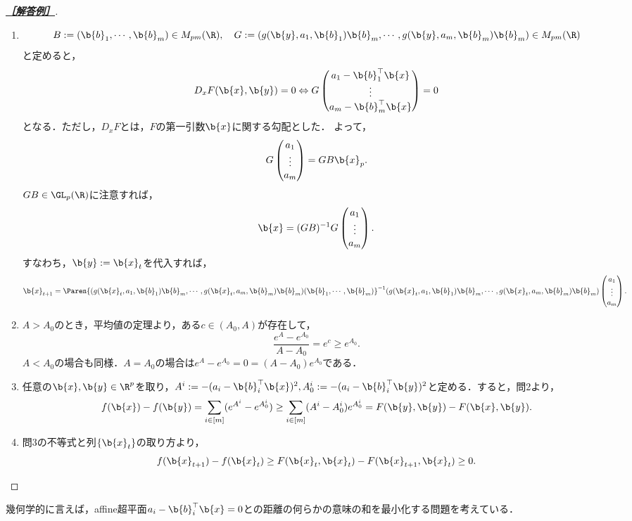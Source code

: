 \documentclass[uplatex,dvipdfmx]{jsarticle}
\begin{document}
\begin{proof}[\textbf{\underline{［解答例］}}]\mbox{}
    \begin{enumerate}
        \item \[B:=(\b{b}_1,\cdots,\b{b}_m)\in M_{pm}(\R),\quad G:=(g(\b{y},a_1,\b{b}_1)\b{b}_m,\cdots,g(\b{y},a_m,\b{b}_m)\b{b}_m)\in M_{pm}(\R)\]
        と定めると，
        \[D_xF(\b{x},\b{y})=0\Leftrightarrow G \begin{pmatrix}a_1-\b{b}_1^\top\b{x}\\\vdots\\a_m-\b{b}_m^\top\b{x}\end{pmatrix}=0\]
        となる．ただし，$D_xF$とは，$F$の第一引数$\b{x}$に関する勾配とした．
        よって，
        \[G \begin{pmatrix}a_1\\\vdots\\a_m\end{pmatrix}=GB\b{x}_p.\]
        $GB\in\GL_p(\R)$に注意すれば，
        \[\b{x}=(GB)^{-1}G \begin{pmatrix}a_1\\\vdots\\a_m\end{pmatrix}.\]
        すなわち，$\b{y}:=\b{x}_t$を代入すれば，
        \[\b{x}_{t+1}=\Paren{(g(\b{x}_t,a_1,\b{b}_1)\b{b}_m,\cdots,g(\b{x}_t,a_m,\b{b}_m)\b{b}_m)(\b{b}_1,\cdots,\b{b}_m)}^{-1}(g(\b{x}_t,a_1,\b{b}_1)\b{b}_m,\cdots,g(\b{x}_t,a_m,\b{b}_m)\b{b}_m)\begin{pmatrix}a_1\\\vdots\\a_m\end{pmatrix}.\]
        \item $A>A_0$のとき，平均値の定理より，ある$c\in(A_0,A)$が存在して，
        \[\frac{e^A-e^{A_0}}{A-A_0}=e^c\ge e^{A_0}.\]
        $A<A_0$の場合も同様．$A=A_0$の場合は$e^A-e^{A_0}=0=(A-A_0)e^{A_0}$である．
        \item 任意の$\b{x},\b{y}\in\R^p$を取り，$A^i:=-(a_i-\b{b}_i^\top\b{x})^2,A_0^i:=-(a_i-\b{b}_i^\top\b{y})^2$と定める．すると，問2より，
        \[f(\b{x})-f(\b{y})=\sum_{i\in[m]}(e^{A^i}-e^{A_0^i})\ge\sum_{i\in[m]}(A^i-A_0^i)e^{A_0^i}=F(\b{y},\b{y})-F(\b{x},\b{y}).\]
        \item 問3の不等式と列$\{\b{x}_t\}$の取り方より，
        \[f(\b{x}_{t+1})-f(\b{x}_{t})\ge F(\b{x}_t,\b{x}_t)-F(\b{x}_{t+1},\b{x}_t)\ge0.\]
    \end{enumerate}
\end{proof}
\begin{remarks}
    幾何学的に言えば，affine超平面$a_i-\b{b}_i^\top\b{x}=0$との距離の何らかの意味の和を最小化する問題を考えている．
\end{remarks}
\end{document}
